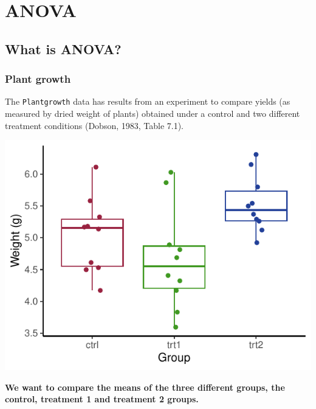 \documentclass[a4paper]{article}\usepackage[]{graphicx}\usepackage[]{xcolor}
\makeatletter
\def\maxwidth{ %
  \ifdim\Gin@nat@width>\linewidth
    \linewidth
  \else
    \Gin@nat@width
  \fi
}
\makeatother
\begin{document}
\section{ANOVA}\label{sec:20}
\subsection{What is ANOVA?}
\subsubsection{Plant growth}
The \lstinline|Plantgrowth| data has results from an experiment to compare yields (as measured by dried weight of plants) obtained under a control and two different treatment conditions (Dobson, 1983, Table 7.1).
\begin{Schunk}


{\centering \includegraphics[width=\maxwidth]{figure/listings-unnamed-chunk-221-1} 

}

\end{Schunk}
\begin{greenbox}
	\textbf{We want to compare the means of the three different groups, the control, treatment 1 and treatment 2 groups.}
\end{greenbox}
\end{document}
